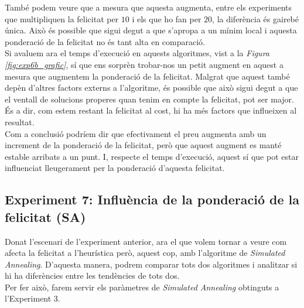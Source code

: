 \documentclass[a4paper]{article}
\begin{document}
\begin{table}[ht]
	També podem veure que a mesura que aquesta augmenta, entre els experiments que multipliquen la felicitat per $10$ i els que ho fan per $20$, la diferència és gairebé única. Això és possible que sigui degut a que s'apropa a un mínim local i aquesta ponderació de la felicitat no és tant alta en comparació. \\
	
	Si avaluem ara el temps d'execució en aquests algoritmes, vist a la \textit{Figura \ref{fig:exp6b_grafic}}, sí que ens sorprèn trobar-nos un petit augment en aquest a mesura que augmentem la ponderació de la felicitat. Malgrat que aquest també depèn d'altres factors externs a l'algoritme, és possible que això sigui degut a que el ventall de solucions properes quan tenim en compte la felicitat, pot ser major. És a dir, com estem restant la felicitat al cost, hi ha més factors que influeixen al resultat. \\
	
	Com a conclusió podríem dir que efectivament el preu augmenta amb un increment de la ponderació de la felicitat, però que aquest augment es manté estable arribats a un punt. I, respecte el temps d'execució, aquest sí que pot estar influenciat lleugerament per la ponderació d'aquesta felicitat.
	
	\subsection{Experiment 7: Influència de la ponderació de la felicitat (SA)}
	
	Donat l'escenari de l'experiment anterior, ara el que volem tornar a veure com afecta la felicitat a l'heurística però, aquest cop, amb l'algoritme de \textit{Simulated Annealing}. D'aquesta manera, podrem comparar tots dos algoritmes i analitzar si hi ha diferències entre les tendències de tots dos. \\
	
	Per fer això, farem servir els paràmetres de \textit{Simulated Annealing} obtinguts a l'Experiment 3. \\
	

\end{table}
\end{document}
